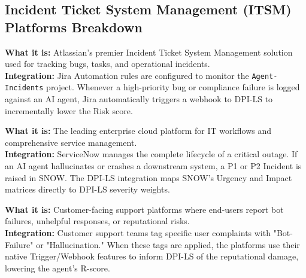 \documentclass[11pt,a4paper]{article}
\begin{document}
\subsection{Incident Ticket System Management (ITSM) Platforms Breakdown}

\vspace{0.3cm}
\begin{tcolorbox}[enhanced, colback=dpiblue!5!white, colframe=dpiblue, title={\textbf{\faClipboardList\ Jira Service Management (JSM)}}, fonttitle=\bfseries, boxrule=1pt, arc=2mm]
\textbf{\color{dpiblue}What it is:} Atlassian's premier Incident Ticket System Management solution used for tracking bugs, tasks, and operational incidents. \\[0.2cm]
\textbf{\color{dpiblue}Integration:} Jira Automation rules are configured to monitor the \texttt{Agent-Incidents} project. Whenever a high-priority bug or compliance failure is logged against an AI agent, Jira automatically triggers a webhook to DPI-LS to incrementally lower the Risk score.
\end{tcolorbox}


\vspace{0.3cm}
\begin{tcolorbox}[enhanced, colback=dpigreen!5!white, colframe=dpigreen, title={\textbf{\faServer\ ServiceNow (SNOW)}}, fonttitle=\bfseries, boxrule=1pt, arc=2mm]
\textbf{\color{dpigreen}What it is:} The leading enterprise cloud platform for IT workflows and comprehensive service management. \\[0.2cm]
\textbf{\color{dpigreen}Integration:} ServiceNow manages the complete lifecycle of a critical outage. If an AI agent hallucinates or crashes a downstream system, a P1 or P2 Incident is raised in SNOW. The DPI-LS integration maps SNOW's Urgency and Impact matrices directly to DPI-LS severity weights.
\end{tcolorbox}


\vspace{0.3cm}
\begin{tcolorbox}[enhanced, colback=dpicloud!5!white, colframe=dpicloud, title={\textbf{\faHeadset\ Zendesk \& Freshservice}}, fonttitle=\bfseries, boxrule=1pt, arc=2mm]
\textbf{\color{dpicloud}What it is:} Customer-facing support platforms where end-users report bot failures, unhelpful responses, or reputational risks. \\[0.2cm]
\textbf{\color{dpicloud}Integration:} Customer support teams tag specific user complaints with "Bot-Failure" or "Hallucination." When these tags are applied, the platforms use their native Trigger/Webhook features to inform DPI-LS of the reputational damage, lowering the agent's R-score.
\end{tcolorbox}
\end{document}
